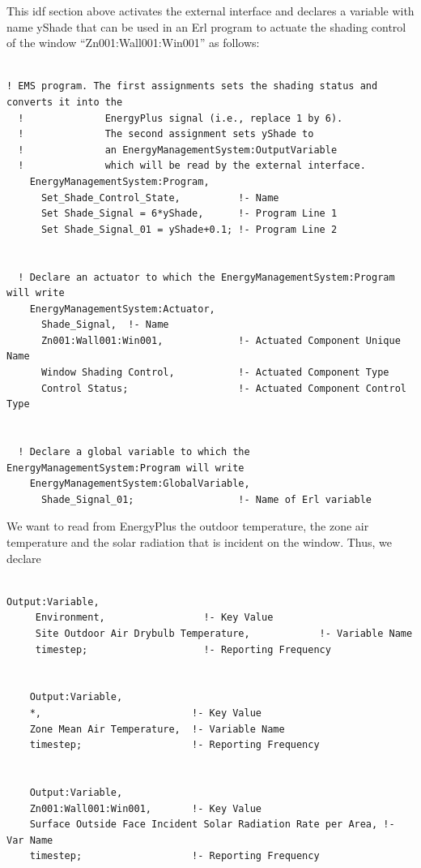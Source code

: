 This idf section above activates the external interface and declares a variable with name yShade that can be used in an Erl program to actuate the shading control of the window ``Zn001:Wall001:Win001'' as follows:

\begin{lstlisting}

! EMS program. The first assignments sets the shading status and converts it into the
  !              EnergyPlus signal (i.e., replace 1 by 6).
  !              The second assignment sets yShade to
  !              an EnergyManagementSystem:OutputVariable
  !              which will be read by the external interface.
    EnergyManagementSystem:Program,
      Set_Shade_Control_State,          !- Name
      Set Shade_Signal = 6*yShade,      !- Program Line 1
      Set Shade_Signal_01 = yShade+0.1; !- Program Line 2


  ! Declare an actuator to which the EnergyManagementSystem:Program will write
    EnergyManagementSystem:Actuator,
      Shade_Signal,  !- Name
      Zn001:Wall001:Win001,             !- Actuated Component Unique Name
      Window Shading Control,           !- Actuated Component Type
      Control Status;                   !- Actuated Component Control Type


  ! Declare a global variable to which the EnergyManagementSystem:Program will write
    EnergyManagementSystem:GlobalVariable,
      Shade_Signal_01;                  !- Name of Erl variable
\end{lstlisting}

We want to read from EnergyPlus the outdoor temperature, the zone air temperature and the solar radiation that is incident on the window. Thus, we declare

\begin{lstlisting}

Output:Variable,
     Environment,                 !- Key Value
     Site Outdoor Air Drybulb Temperature,            !- Variable Name
     timestep;                    !- Reporting Frequency


    Output:Variable,
    *,                          !- Key Value
    Zone Mean Air Temperature,  !- Variable Name
    timestep;                   !- Reporting Frequency


    Output:Variable,
    Zn001:Wall001:Win001,       !- Key Value
    Surface Outside Face Incident Solar Radiation Rate per Area, !- Var Name
    timestep;                   !- Reporting Frequency
\end{lstlisting}

